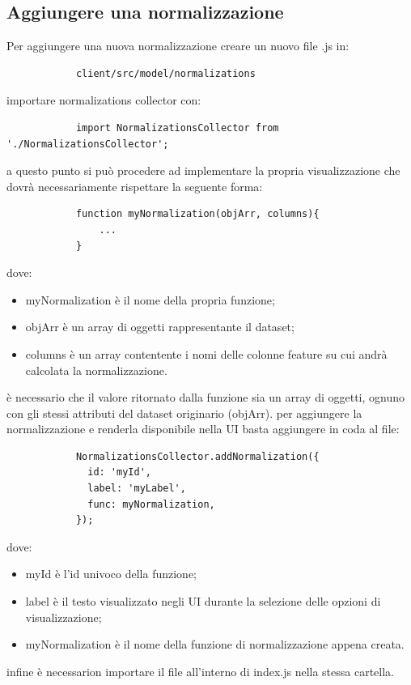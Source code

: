         \subsection{Aggiungere una normalizzazione}
        Per aggiungere una nuova normalizzazione creare un nuovo file .js in:
        \begin{verbatim}
            client/src/model/normalizations
        \end{verbatim}
        importare normalizations collector con: 
        \begin{verbatim}
            import NormalizationsCollector from './NormalizationsCollector';
        \end{verbatim}
        a questo punto si può procedere ad implementare la propria visualizzazione che dovrà necessariamente rispettare la seguente forma:
        \begin{verbatim}
            function myNormalization(objArr, columns){
                ...
            }
        \end{verbatim}
        dove:
        \begin{itemize}
            \item myNormalization è il nome della propria funzione;
            \item objArr è un array di oggetti rappresentante il dataset;
            \item columns è un array contentente i nomi delle colonne feature su cui andrà calcolata la normalizzazione.
        \end{itemize}
        è necessario che il valore ritornato dalla funzione sia un array di oggetti, ognuno con gli stessi attributi del dataset originario (objArr).
        per aggiungere la normalizzazione e renderla disponibile nella UI basta aggiungere in coda al file:
        \begin{verbatim}
            NormalizationsCollector.addNormalization({
              id: 'myId',
              label: 'myLabel',
              func: myNormalization,
            });
        \end{verbatim}
        dove:
        \begin{itemize}
            \item myId è l'id univoco della funzione;
            \item label è il testo visualizzato negli UI durante la selezione delle opzioni di visualizzazione;
            \item myNormalization è il nome della funzione di normalizzazione appena creata.
        \end{itemize}
        infine è necessarion importare il file all'interno di index.js nella stessa cartella.
